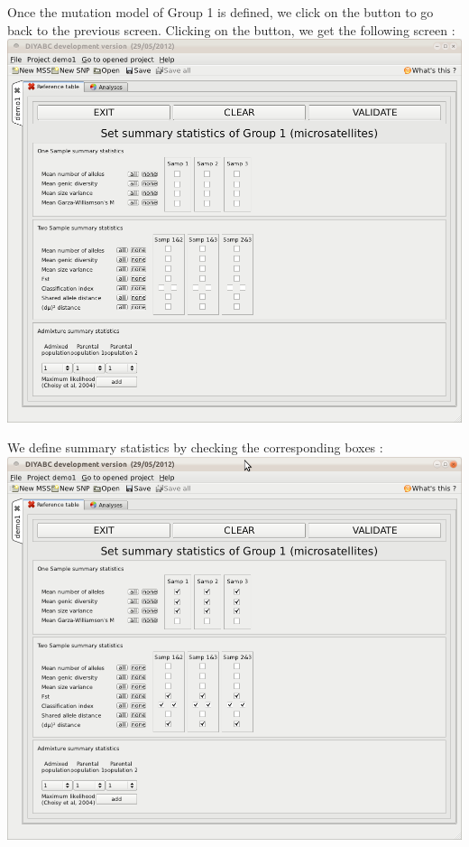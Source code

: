 Once the mutation model of Group 1 is defined, we click on the  button to go back to the previous screen. Clicking on the  button, we get the following screen :\\ 

\includegraphics[scale=0.35]{gui_pictures/Capture-DIYABC-20.png} 

We define summary statistics by checking the corresponding boxes :\\ 

\includegraphics[scale=0.35]{gui_pictures/Capture-DIYABC-21.png} 

